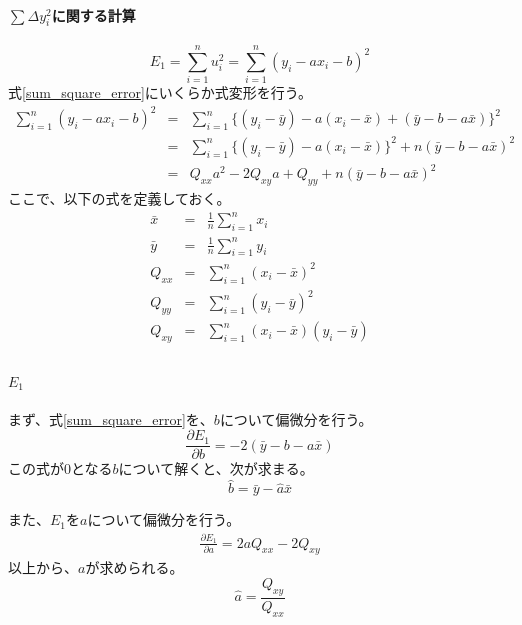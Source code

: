 \paragraph{$\sum \Delta y_i^2$に関する計算}
\begin{equation}\label{sum_square_error}
 E_1 = \sum_{i=1}^n u_i^2 = \sum_{i=1}^n (y_i-a x_i-b)^2
\end{equation}
式\ref{sum_square_error}にいくらか式変形を行う。
\begin{eqnarray*}
 \sum_{i=1}^n (y_i-a x_i-b)^2 &=& \sum_{i=1}^n \{(y_i-\bar{y}) - a(x_i-\bar{x}) +(\bar{y}-b-a\bar{x})  \}^2\\
 & =& \sum_{i=1}^n \{ (y_i-\bar{y})-a(x_i-\bar{x})  \}^2+n(\bar{y}-b-a\bar{x})^2 \\
 &=& Q_{xx}a^2-2Q_{xy}a+Q_{yy}+n(\bar{y}-b-a\bar{x})^2
\end{eqnarray*}
ここで、以下の式を定義しておく。
\begin{eqnarray*}
 \bar{x} &=& \frac{1}{n}\sum_{i=1}^n x_i \\
 \bar{y}&=& \frac{1}{n}\sum_{i=1}^n y_i \\
 Q_{xx} &=& \sum_{i=1}^n (x_i-\bar{x})^2 \\
 Q_{yy} &=& \sum_{i=1}^n (y_i-\bar{y})^2 \\
 Q_{xy} &=& \sum_{i=1}^n (x_i-\bar{x})(y_i-\bar{y}) \\
\end{eqnarray*}

\paragraph{$E_1$}
まず、式\ref{sum_square_error}を、$b$について偏微分を行う。
\begin{equation*}
 \frac{\partial E_1}{\partial b} = -2(\bar{y}-b-a\bar{x})
\end{equation*}
この式が$0$となる$b$について解くと、次が求まる。
\begin{equation*}
 \hat{b} = \bar{y}-\hat{a}\bar{x}
\end{equation*}

また、$E_1$を$a$について偏微分を行う。
\begin{eqnarray*}
 \frac{\partial E_1}{\partial a} = 2aQ_{xx}-2Q_{xy}
\end{eqnarray*}
以上から、$a$が求められる。
\begin{equation*}
 \hat{a} = \frac{Q_{xy}}{Q_{xx}}
\end{equation*}


